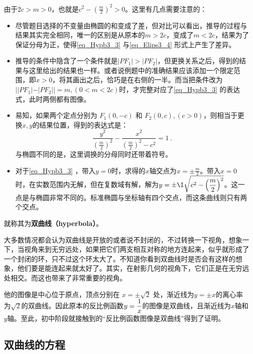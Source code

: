 由于$2c>m>0$，也就是$\displaystyle c^2-\left(\frac{m}{2}\right)^2>0$。这里有几点需要注意的：
\begin{itemize}
\item 尽管题目选择的不变量由椭圆的和变成了差，但对比可以看出，推导的过程与结果其实完全相同，唯一的区别是从原本的$m>2c$，变成了$m<2c$，结果为了保证分母为正，使得\autoref{eq_Hypb3_3} 与\autoref{eq_Elips3_4} 形式上产生了差异。
\item 推导的条件中隐含了一个条件就是$|PF_1| >|PF_2|$，但更换关系之后，得到的结果与这里给出的结果也一样。或者说例题中的准确结果应该添加一个限定范围，即$x>0$，将其画出之后，恰巧是在右侧的一半。而当把条件改为$||PF_1| - |PF_2|| = m,(0<m <2c)$时，才完整对应了\autoref{eq_Hypb3_3} 的表达式，此时两侧都有图像。
\item 易知，如果两个定点分别为 $F_1(0,-c)$ 和 $F_2(0,c),(c>0)$，则相当于更换$x,y$的结果位置，得到的表达式是：
\begin{equation}
\frac{y^2}{\left(\displaystyle\frac{m}{2}\right)^2}-\frac{x^2}{\displaystyle\left(\frac{m}{2}\right)^2-c^2} =1~.
\end{equation}
与椭圆不同的是，这里调换的分母同时还带着符号。
\item 对于\autoref{eq_Hypb3_3} ，带入$y=0$时，求得的$x$轴交点为$\displaystyle x=\pm\frac{m}{2}$。带入$x=0$时，在实数范围内无解，但在复数域有解，解为$\displaystyle y=\pm\I\sqrt{c^2-\left(\frac{m}{2}\right)^2}$。这一点是与椭圆非常不同的。标准椭圆与坐标轴有四个交点，而这条曲线则只有两个交点。
\end{itemize}



就称其为\textbf{双曲线（hyperbola）}。



大多数情况都会认为双曲线是开放的或者说不封闭的，不过转换一下视角，想象一下，当视角来到无穷远处，如果把它们两支相互对称的地方连起来，似乎就形成了一个封闭的环，只不过这个环太大了。不知道你看到双曲线时是否会有这样的想象，他们要是能连起来就太好了。其实，在射影几何的视角下，它们正是在无穷远处相交。而这也带来了非常重要的视角。
 

他的图像是中心位于原点，顶点分别在 $x = \pm \sqrt{2}$ 处，渐近线为$y = \pm x$的离心率为$\sqrt{2}$的双曲线。因此原本的反比例函数$\displaystyle y={1\over x}$的图像是双曲线，且渐近线为$x$轴和$y$轴。至此，初中阶段就接触到的“反比例函数图像是双曲线”得到了证明。

\subsection{双曲线的方程}

